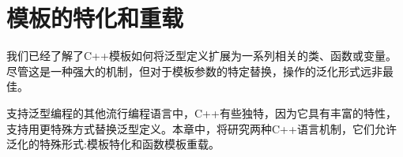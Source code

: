\chapter{模板的特化和重载}
我们已经了解了C++模板如何将泛型定义扩展为一系列相关的类、函数或变量。尽管这是一种强大的机制，但对于模板参数的特定替换，操作的泛化形式远非最佳。

支持泛型编程的其他流行编程语言中，C++有些独特，因为它具有丰富的特性，支持用更特殊方式替换泛型定义。本章中，将研究两种C++语言机制，它们允许泛化的特殊形式:模板特化和函数模板重载。





